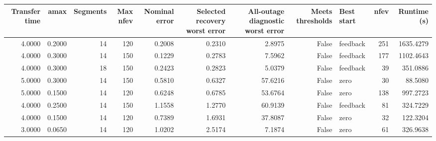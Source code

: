 \begin{tabular}{rrrrrrrrlrr}
\toprule
Transfer time & amax & Segments & Max nfev & Nominal error & Selected recovery worst error & All-outage diagnostic worst error & Meets thresholds & Best start & nfev & Runtime (s) \\
\midrule
4.0000 & 0.2000 & 14 & 120 & 0.2008 & 0.2310 & 2.8975 & False & feedback & 251 & 1635.4279 \\
4.0000 & 0.3000 & 14 & 150 & 0.1229 & 0.2783 & 7.5962 & False & feedback & 177 & 1102.4643 \\
4.0000 & 0.3000 & 18 & 150 & 0.2423 & 0.2823 & 5.0379 & False & feedback & 39 & 351.0886 \\
5.0000 & 0.3000 & 14 & 150 & 0.5810 & 0.6327 & 57.6216 & False & zero & 30 & 88.5080 \\
5.0000 & 0.1500 & 14 & 120 & 0.6248 & 0.6785 & 53.6764 & False & zero & 138 & 997.2723 \\
4.0000 & 0.2500 & 14 & 150 & 1.1558 & 1.2770 & 60.9139 & False & feedback & 81 & 324.7229 \\
4.0000 & 0.1500 & 14 & 120 & 0.7389 & 1.6931 & 37.8087 & False & zero & 32 & 122.3204 \\
3.0000 & 0.0650 & 14 & 120 & 1.0202 & 2.5174 & 7.1874 & False & zero & 61 & 326.9638 \\
\bottomrule
\end{tabular}
